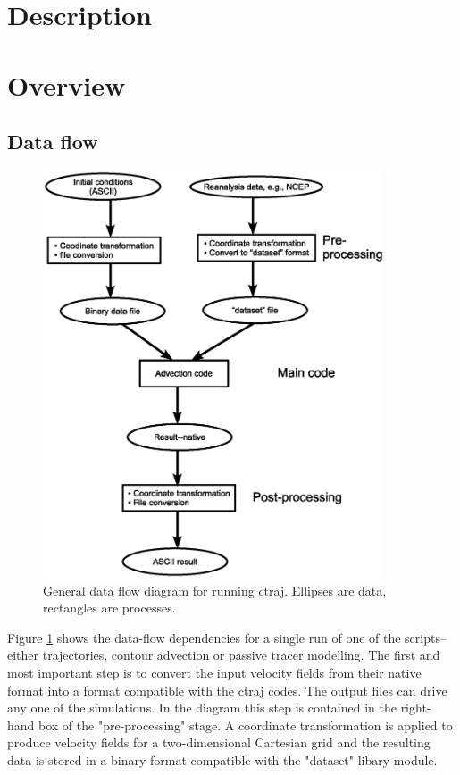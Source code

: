 \documentclass[12pt,letterpaper]{article}
\begin{document}
\tableofcontents

\section{Description}



\section{Overview}

\subsection{Data flow}

\begin{figure}
\includegraphics[width=0.9\textwidth]{data_flow_general.eps}
\caption{General data flow diagram for running ctraj.  
Ellipses are data, rectangles are processes.}
\label{data_flow_general}
\end{figure}

Figure \ref{data_flow_general} shows the data-flow dependencies for a single
run of one of the scripts--either trajectories, contour advection or passive
tracer modelling.
The first and most important step is to convert the input velocity fields 
from their native format into a format compatible with the ctraj codes.
The output files can drive any one of the simulations.
In the diagram this step is contained in the right-hand box of the 
"pre-processing" stage.
A coordinate transformation is applied to produce velocity fields for
a two-dimensional Cartesian grid and the resulting data is stored in
a binary format compatible with the "dataset" libary module.
\end{document}
